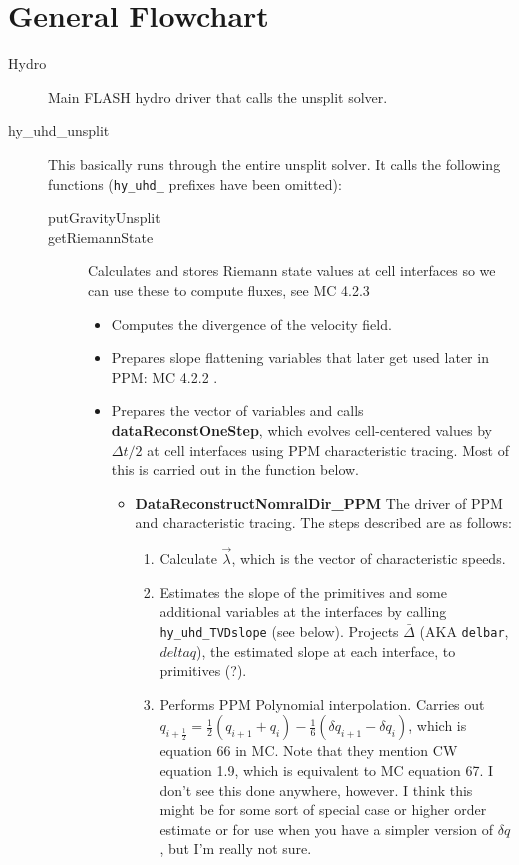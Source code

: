 \documentclass[preprint,11pt]{aastex}
\begin{document}
\section{General Flowchart}
\label{sec:flowchart}
\begin{description}
	\item[Hydro] Main FLASH hydro driver that calls the unsplit solver.
	\item[hy\_uhd\_unsplit] This basically runs through the entire unsplit solver.  It calls the following functions (\verb!hy_uhd_! prefixes have been omitted):
	\begin{description}
		\item[putGravityUnsplit]
		\item[getRiemannState]  Calculates and stores Riemann state values at cell interfaces so we can use these to compute fluxes, see MC 4.2.3
		\begin{itemize}
			\item Computes the divergence of the velocity field.
			\item Prepares slope flattening variables that later get used later in PPM: MC 4.2.2 .
			\item Prepares the vector of variables and calls \textbf{dataReconstOneStep}, which evolves cell-centered values by $\Delta t / 2$ at cell interfaces using PPM characteristic tracing.  Most of this is carried out in the function below.
			\begin{itemize}
				\item \textbf{DataReconstructNomralDir\_PPM} The driver of PPM and characteristic tracing.  The steps described are as follows:
				\begin{enumerate}
					\item Calculate $\vec{\lambda}$, which is the vector of characteristic speeds.
					\item Estimates the slope of the primitives and some additional variables at the interfaces by calling \verb!hy_uhd_TVDslope! (see below).  Projects $\bar{\Delta}$ (AKA \verb!delbar!, $delta q$), the estimated slope at each interface, to primitives (?).%
					\item Performs PPM Polynomial interpolation.   Carries out $q_{i+\frac{1}{2}} = \frac{1}{2} \left( q_{i+1} + q_i \right) - \frac{1}{6} \left( \delta q_{i+1} - \delta q_i \right)$, which is equation 66 in MC.  Note that they mention CW equation 1.9, which is equivalent to MC equation 67.  I don't see this done anywhere, however.  I think this might be for some sort of special case or higher order estimate or for use when you have a simpler version of $\delta q$, but I'm really not sure.

\end{enumerate}
\end{itemize}
\end{itemize}
\end{description}
\end{description}
\end{document}
